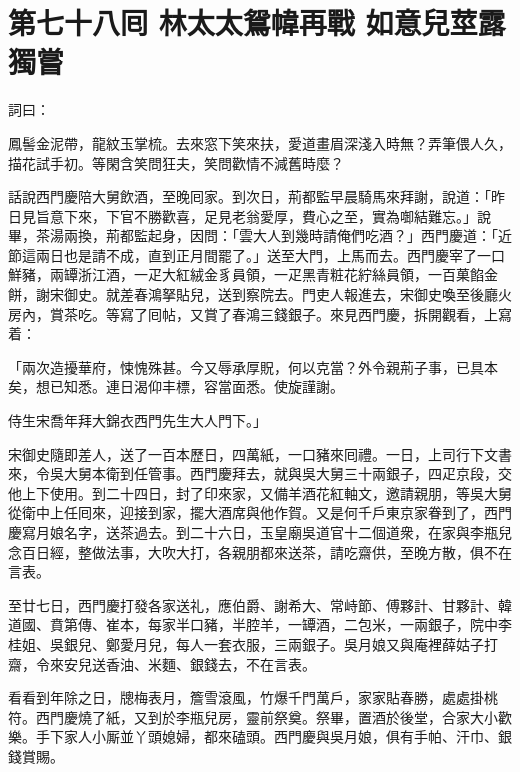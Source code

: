
\chapter*{第七十八囘 林太太鴛幃再戰 如意兒莖露獨嘗}


詞曰：

\begin{myquote}
鳳髻金泥帶，龍紋玉掌梳。去來窓下笑來扶，愛道畫眉深淺入時無？弄筆偎人久，描花試手初。等閑含笑問狂夫，笑問歡情不減舊時麼？
\end{myquote}

話說西門慶陪大舅飲酒，至晚囘家。到次日，荊都監早晨騎馬來拜謝，說道：「昨日見旨意下來，下官不勝歡喜，足見老翁愛厚，費心之至，實為啣結難忘。」說畢，茶湯兩換，荊都監起身，因問：「雲大人到幾時請俺們吃酒？」西門慶道：「近節這兩日也是請不成，直到正月間罷了。」送至大門，上馬而去。西門慶宰了一口鮮豬，兩罈浙江酒，一疋大紅絨金豸員領，一疋黑青粧花紵絲員領，一百菓餡金餅，謝宋御史。就差春鴻拏貼兒，送到察院去。門吏人報進去，宋御史喚至後廳火房內，賞茶吃。等寫了囘帖，又賞了春鴻三錢銀子。來見西門慶，拆開觀看，上寫着：

\begin{myquote}[\markfont]
「兩次造擾華府，悚愧殊甚。今又辱承厚貺，何以克當？外令親荊子事，已具本矣，想已知悉。連日渴仰丰標，容當面悉。使旋謹謝。

侍生宋喬年拜大錦衣西門先生大人門下。」
\end{myquote}

宋御史隨即差人，送了一百本歷日，四萬紙，一口豬來囘禮。一日，上司行下文書來，令吳大舅本衛到任管事。西門慶拜去，就與吳大舅三十兩銀子，四疋京段，交他上下使用。到二十四日，封了印來家，又備羊酒花紅軸文，邀請親朋，等吳大舅從衛中上任囘來，迎接到家，擺大酒席與他作賀。又是何千戶東京家眷到了，西門慶寫月娘名字，送茶過去。到二十六日，玉皇廟吳道官十二個道衆，在家與李瓶兒念百日經，整做法事，大吹大打，各親朋都來送茶，請吃齋供，至晚方散，俱不在言表。

至廿七日，西門慶打發各家送礼，應伯爵、謝希大、常峙節、傅夥計、甘夥計、韓道國、賁第傳、崔本，每家半口豬，半腔羊，一罈酒，二包米，一兩銀子，院中李桂姐、吳銀兒、鄭愛月兒，每人一套衣服，三兩銀子。{}吳月娘又與庵裡薛姑子打齋，令來安兒送香油、米麵、銀錢去，不在言表。

看看到年除之日，牕梅表月，簷雪滾風，{}竹爆千門萬戶，家家貼春勝，處處掛桃符。西門慶燒了紙，又到於李瓶兒房，靈前祭奠。祭畢，置酒於後堂，合家大小歡樂。手下家人小厮並丫頭媳婦，都來磕頭。西門慶與吳月娘，俱有手帕、汗巾、銀錢賞賜。

